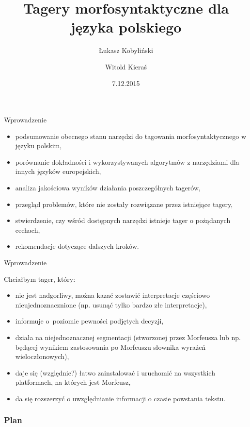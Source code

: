 \documentclass[xcolor=dvipsnames,polish]{beamer}
\title[Tagery dla języka polskiego]{Tagery morfosyntaktyczne dla języka polskiego}
\author{Łukasz Kobyliński \and Witold Kieraś}
\institute[IPI PAN]{%
     Instytut Podstaw Informatyki Polskiej Akademii Nauk\\
     ul. Jana Kazimierza 5, 01-248 Warszawa, Poland}
\date{7.12.2015}
\begin{document}
\begin{frame}
  \titlepage
\end{frame}

\begin{frame}{Wprowadzenie}
\begin{itemize}
  \item podsumowanie obecnego stanu narzędzi do tagowania morfosyntaktycznego w języku polskim,
  \item porównanie dokładności i wykorzystywanych algorytmów z narzędziami dla innych języków europejskich,
  \item analiza jakościowa wyników działania poszczególnych tagerów,
  \item przegląd problemów, które nie zostały rozwiązane przez istniejące tagery,
  \item stwierdzenie, czy wśród dostępnych narzędzi istnieje tager o pożądanych cechach,%
  \item rekomendacje dotyczące dalszych kroków.
\end{itemize}
\end{frame}

\begin{frame}{Wprowadzenie}
  \vspace{0.5cm}

  Chciałbym tager, który:
   \begin{itemize}
   \item nie jest nadgorliwy, można kazać zostawić interpretacje częściowo nieujednoznacznione (np. usunąć tylko bardzo złe interpretacje),
   \item informuje o~poziomie pewności podjętych decyzji,
   \item działa na niejednoznacznej segmentacji (stworzonej przez Morfeusza lub np. będącej wynikiem zastosowania po Morfeuszu słownika wyrażeń wieloczłonowych),
   \item daje się (względnie?) łatwo zainstalować i uruchomić na wszystkich platformach, na których jest Morfeusz,
   \item da się rozszerzyć o uwzględnianie informacji o czasie powstania tekstu.
   \end{itemize}
\end{frame}

\begin{frame}
\frametitle{Plan}
\tableofcontents
\end{frame}
\end{document}
